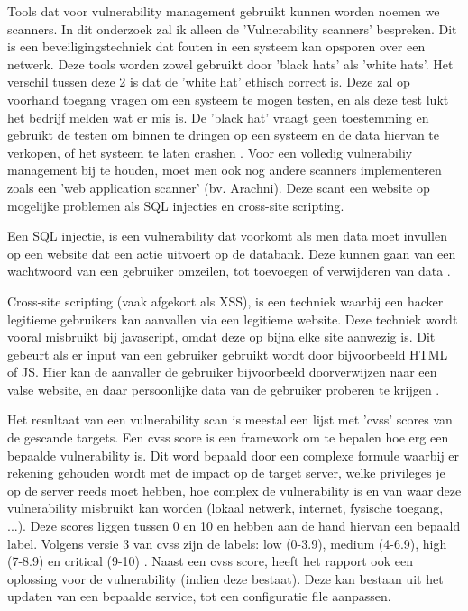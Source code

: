 Tools dat voor vulnerability management gebruikt kunnen worden noemen we scanners. In dit onderzoek zal ik alleen de 'Vulnerability scanners' bespreken. Dit is een beveiligingstechniek  dat fouten in een systeem kan opsporen \textcite{Techopedia} over een netwerk. Deze tools worden zowel gebruikt door 'black hats' als 'white hats'. Het verschil tussen deze 2 is dat de 'white hat' ethisch correct is. Deze zal op voorhand toegang vragen om een systeem te mogen testen, en als deze test lukt het bedrijf melden wat er mis is. De 'black hat' vraagt geen toestemming en gebruikt de testen om binnen te dringen op een systeem en de data hiervan te verkopen, of het systeem te laten crashen \textcite{Howtogeek}. Voor een volledig vulnerabiliy management bij te houden, moet men ook nog andere scanners implementeren zoals een 'web application scanner' (bv. Arachni). Deze scant een website op mogelijke problemen als SQL injecties en cross-site scripting. 

Een SQL injectie, is een vulnerability dat voorkomt als men data moet invullen op een website dat een actie uitvoert op de databank. Deze kunnen gaan van een wachtwoord van een gebruiker omzeilen, tot toevoegen of verwijderen van data \textcite{acunetix}.

Cross-site scripting (vaak afgekort als XSS), is een techniek waarbij een hacker legitieme gebruikers kan aanvallen via een legitieme website. Deze techniek wordt vooral misbruikt bij javascript, omdat deze op bijna elke site aanwezig is. Dit gebeurt als er input van een gebruiker gebruikt wordt door bijvoorbeeld HTML of JS. Hier kan de aanvaller de gebruiker bijvoorbeeld doorverwijzen naar een valse website, en daar persoonlijke data van de gebruiker proberen te krijgen \textcite{acunetix-xss}.

Het resultaat van een vulnerability scan is meestal een lijst met 'cvss' scores van de gescande targets. Een cvss score is een framework om te bepalen hoe erg een bepaalde vulnerability is. Dit word bepaald door een complexe formule waarbij er rekening gehouden wordt met de impact op de target server, welke privileges je op de server reeds moet hebben, hoe complex de vulnerability is en van waar deze vulnerability misbruikt kan worden (lokaal netwerk, internet, fysische toegang, ...). Deze scores liggen tussen 0 en 10 en hebben aan de hand hiervan een bepaald label. Volgens versie 3 van cvss zijn de labels: low (0-3.9), medium (4-6.9), high (7-8.9) en critical (9-10) \textcite{Nist}. Naast een cvss score, heeft het rapport ook een oplossing voor de vulnerability (indien deze bestaat). Deze kan bestaan uit het updaten van een bepaalde service, tot een configuratie file aanpassen.

